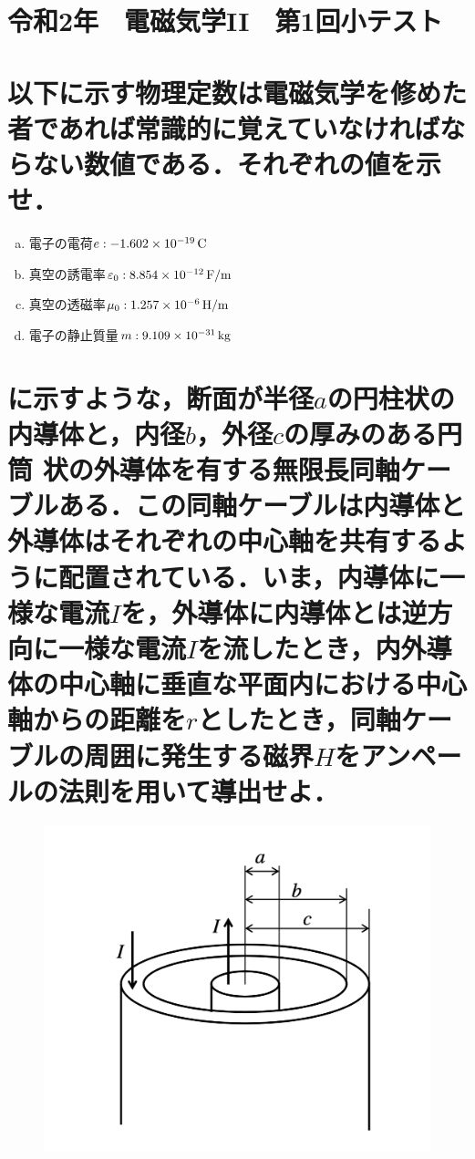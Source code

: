 \documentclass[dvipdfmx]{ujarticle}
\begin{document}
\clearpage
\setcounter{section}{0}
\section*{令和2年　電磁気学II　第1回小テスト}
\section{以下に示す物理定数は電磁気学を修めた者であれば常識的に覚えていなければならない数値である．それぞれの値を示せ．}
\begin{enumerate}[(a)]
	\item 電子の電荷$e:-1.602 \times 10^{-19}\,\rm{C}$
	\item 真空の誘電率$\varepsilon_{0}:8.854 \times 10^{-12}\,\rm{F/m}$
	\item 真空の透磁率$\mu_{0}:1.257 \times 10^{-6}\,\rm{H/m}$
	\item 電子の静止質量$m:9.109\times 10^{-31}\,\rm{kg}$
\end{enumerate}

\section{に示すような，断面が半径$a$の円柱状の内導体と，内径$b$，外径$c$の厚みのある円筒 状の外導体を有する無限長同軸ケーブルある．この同軸ケーブルは内導体と外導体はそれぞれの中心軸を共有するように配置されている．いま，内導体に一様な電流$I$を，外導体に内導体とは逆方向に一様な電流$I$を流したとき，内外導体の中心軸に垂直な平面内における中心軸からの距離を$r$としたとき，同軸ケーブルの周囲に発生する磁界$H$をアンペールの法則を用いて導出せよ．}

\begin{figure}[h]
	\centering
	\includegraphics[scale=0.35]{./fig/R03_fig1.png}
	\caption{}
	\label{fig:1}
\end{figure}
\end{document}
